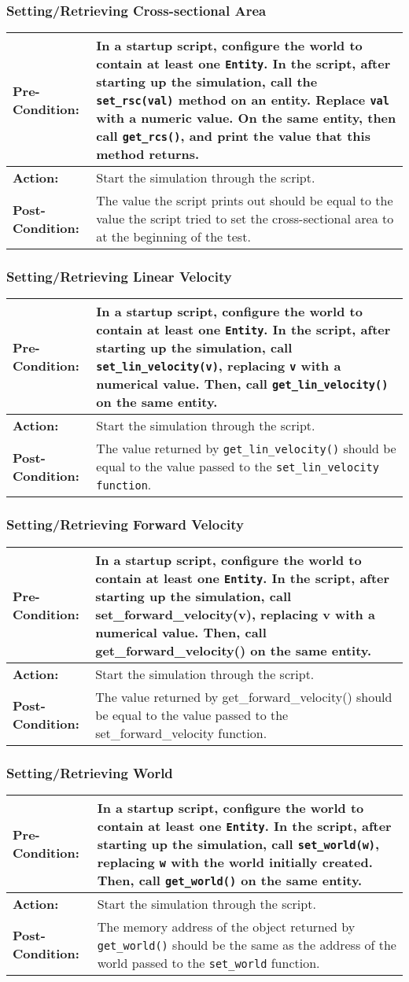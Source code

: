 \documentclass[titlepage]{article}
\newcommand{\testcase}[3]{
    \begin{center}
    \begin{tabular}{| l | p{0.7\textwidth}|}
        \hline
        \rowcolor[gray]{0.8}\textbf{Pre-Condition:} & #1 \\ \hline
        \textbf{Action:} & #2 \\ \hline
        \rowcolor[gray]{0.8}\textbf{Post-Condition:} & #3 \\ \hline
    \end{tabular}
    \end{center}
}
\begin{document}
\subsubsection{Setting/Retrieving Cross-sectional Area}
\testcase{In a startup script, configure the world to contain at least one \texttt{Entity}. In the script, after starting up the simulation, call the \texttt{set\_rsc(val)} method on an entity. Replace \texttt{val} with a numeric value. On the same entity, then call \texttt{get\_rcs()}, and print the value that this method returns.}{Start the simulation through the script.}{The value the script prints out should be equal to the value the script tried to set the cross-sectional area to at the beginning of the test.}

\subsubsection{Setting/Retrieving Linear Velocity}
\testcase{In a startup script, configure the world to contain at least one \texttt{Entity}. In the script, after starting up the simulation, call \texttt{set\_lin\_velocity(v)}, replacing \texttt{v} with a numerical value. Then, call \texttt{get\_lin\_velocity()} on the same entity.}{Start the simulation through the script.}{The value returned by \texttt{get\_lin\_velocity()} should be equal to the value passed to the \texttt{set\_lin\_velocity function}.}

\subsubsection{Setting/Retrieving Forward Velocity}
\testcase{In a startup script, configure the world to contain at least one \texttt{Entity}. In the script, after starting up the simulation, call set\_forward\_velocity(v), replacing v with a numerical value. Then, call get\_forward\_velocity() on the same entity.}{Start the simulation through the script.}{The value returned by get\_forward\_velocity() should be equal to the value passed to the set\_forward\_velocity function.}

\subsubsection{Setting/Retrieving World}
\testcase{In a startup script, configure the world to contain at least one \texttt{Entity}. In the script, after starting up the simulation, call \texttt{set\_world(w)}, replacing \texttt{w} with the world initially created. Then, call \texttt{get\_world()} on the same entity.}{Start the simulation through the script.}{The memory address of the object returned by \texttt{get\_world()} should be the same as the address of the world passed to the \texttt{set\_world} function.}
\end{document}
